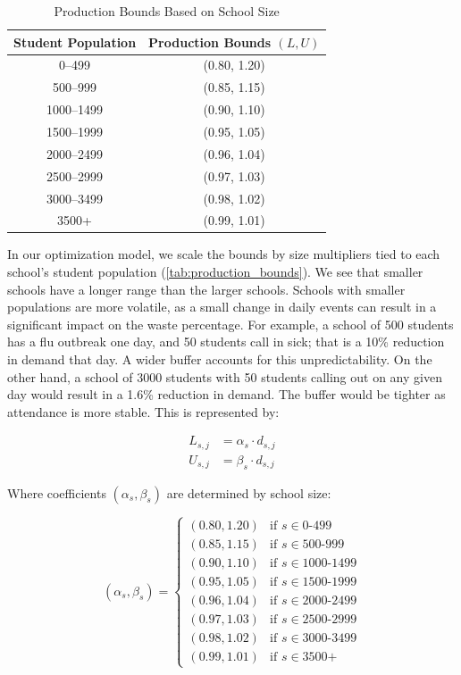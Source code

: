 \documentclass[journal]{IEEEtran}
\begin{document}
\begin{table}[t]
    \caption{Production Bounds Based on School Size}
    \label{tab:production_bounds}
    \centering
    \begin{tabular}{cc}
        \toprule
        \textbf{Student Population} & \textbf{Production Bounds $(L, U)$} \\
        \midrule
        0--499 & (0.80, 1.20) \\
        500--999 & (0.85, 1.15) \\
        1000--1499 & (0.90, 1.10) \\
        1500--1999 & (0.95, 1.05) \\
        2000--2499 & (0.96, 1.04) \\
        2500--2999 & (0.97, 1.03) \\
        3000--3499 & (0.98, 1.02) \\
        3500+ & (0.99, 1.01) \\
        \bottomrule
    \end{tabular}
\end{table}

In our optimization model, we scale the bounds by size multipliers tied to each school's student population (\autoref{tab:production_bounds}). We see that smaller schools have a longer range than the larger schools. Schools with smaller populations are more volatile, as a small change in daily events can result in a significant impact on the waste percentage. For example, a school of 500 students has a flu outbreak one day, and 50 students call in sick; that is a 10\% reduction in demand that day. A wider buffer accounts for this unpredictability. On the other hand, a school of 3000 students with 50 students calling out on any given day would result in a 1.6\% reduction in demand. The buffer would be tighter as attendance is more stable. This is represented by:

\begin{equation}
    \begin{aligned}
        L_{s,j} &= \alpha_s \cdot d_{s,j} \\
        U_{s,j} &= \beta_s \cdot d_{s,j}
    \end{aligned}
\end{equation}

Where coefficients $(\alpha_s, \beta_s)$ are determined by school size:

\[
(\alpha_s, \beta_s) = 
\begin{cases} 
    (0.80, 1.20) & \text{if } s \in \text{0-499} \\
    (0.85, 1.15) & \text{if } s \in \text{500-999} \\
    (0.90, 1.10) & \text{if } s \in \text{1000-1499} \\
    (0.95, 1.05) & \text{if } s \in \text{1500-1999} \\
    (0.96, 1.04) & \text{if } s \in \text{2000-2499} \\
    (0.97, 1.03) & \text{if } s \in \text{2500-2999} \\
    (0.98, 1.02) & \text{if } s \in \text{3000-3499} \\
    (0.99, 1.01) & \text{if } s \in \text{3500+}
\end{cases}
\]
\end{document}

